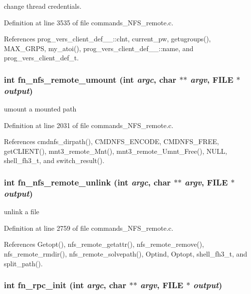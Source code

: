 change thread credentials. 

Definition at line 3535 of file commands\_\-NFS\_\-remote.c.

References prog\_\-vers\_\-client\_\-def\_\-\_\-::clnt, current\_\-pw, getugroups(), MAX\_\-GRPS, my\_\-atoi(), prog\_\-vers\_\-client\_\-def\_\-\_\-::name, and prog\_\-vers\_\-client\_\-def\_\-t.
\subsubsection{\setlength{\rightskip}{0pt plus 5cm}int fn\_\-nfs\_\-remote\_\-umount (int {\em argc}, char $\ast$$\ast$ {\em argv}, FILE $\ast$ {\em output})}\label{commands__NFS__remote_8c_a58}


umount a mounted path 

Definition at line 2031 of file commands\_\-NFS\_\-remote.c.

References cmdnfs\_\-dirpath(), CMDNFS\_\-ENCODE, CMDNFS\_\-FREE, get\-CLIENT(), mnt3\_\-remote\_\-Mnt(), mnt3\_\-remote\_\-Umnt\_\-Free(), NULL, shell\_\-fh3\_\-t, and switch\_\-result().
\subsubsection{\setlength{\rightskip}{0pt plus 5cm}int fn\_\-nfs\_\-remote\_\-unlink (int {\em argc}, char $\ast$$\ast$ {\em argv}, FILE $\ast$ {\em output})}\label{commands__NFS__remote_8c_a64}


unlink a file 

Definition at line 2759 of file commands\_\-NFS\_\-remote.c.

References Getopt(), nfs\_\-remote\_\-getattr(), nfs\_\-remote\_\-remove(), nfs\_\-remote\_\-rmdir(), nfs\_\-remote\_\-solvepath(), Optind, Optopt, shell\_\-fh3\_\-t, and split\_\-path().
\subsubsection{\setlength{\rightskip}{0pt plus 5cm}int fn\_\-rpc\_\-init (int {\em argc}, char $\ast$$\ast$ {\em argv}, FILE $\ast$ {\em output})}\label{commands__NFS__remote_8c_a34}


